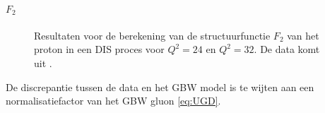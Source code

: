 \documentclass[a4paper,11pt]{article}
\numberwithin{equation}{section} %
\begin{document}
      \paragraph{$F_2$}
\begin{figure} [H]
\centering
{}
\caption{Resultaten voor de berekening van de structuurfunctie $F_2$ van het proton in een DIS proces voor $Q^2=24$ en $Q^2=32$. De data komt uit \cite{ZEUS}.}
\label{fig:ResF2}
\end{figure}
De discrepantie tussen de data en het GBW model is te wijten aan een normalisatiefactor van het GBW gluon \eqref{eq:UGD}.
\end{document}
